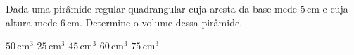 Dada uma pirâmide regular quadrangular cuja aresta da base mede $5$\,cm e cuja altura mede $6$\,cm. Determine o volume dessa pirâmide.

$50$\,cm$^3$
$25$\,cm$^3$
$45$\,cm$^3$
$60$\,cm$^3$
$75$\,cm$^3$



